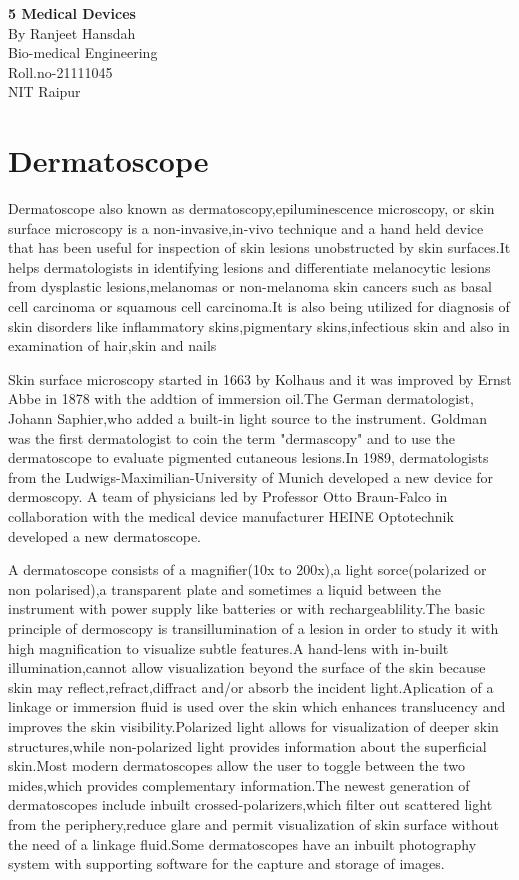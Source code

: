 \documentclass[12pt,A4paper]{article}
\begin{document}
\begin{center}
\huge\textbf{5 Medical Devices}\\[10pt]
\large{By Ranjeet Hansdah}\\
\large{Bio-medical Engineering}\\
\large{Roll.no-21111045}\\
\large{NIT Raipur}\\
\end{center}
\newpage
\section{Dermatoscope}

Dermatoscope also known as dermatoscopy,epiluminescence microscopy, or skin surface microscopy is a non-invasive,in-vivo technique and a hand held device that has been useful for inspection of skin lesions unobstructed by skin surfaces.It helps dermatologists in identifying lesions and differentiate melanocytic lesions from dysplastic lesions,melanomas or non-melanoma skin cancers such as basal cell carcinoma or squamous cell carcinoma.It is also being utilized for diagnosis of skin disorders like inflammatory skins,pigmentary skins,infectious skin and also in examination of hair,skin and nails

Skin surface microscopy started in 1663 by Kolhaus and it was improved by Ernst Abbe in 1878 with the addtion of immersion oil.The German dermatologist, Johann Saphier,who added a built-in light source to the instrument. Goldman was the first dermatologist to coin the term "dermascopy" and to use the dermatoscope to evaluate pigmented cutaneous lesions.In 1989, dermatologists from the Ludwigs-Maximilian-University of Munich developed a new device for dermoscopy. A team of physicians led by Professor Otto Braun-Falco in collaboration with the medical device manufacturer HEINE Optotechnik developed a new dermatoscope.

A dermatoscope consists of a magnifier(10x to 200x),a light sorce(polarized or non polarised),a transparent plate and sometimes a liquid between the instrument with power supply like batteries or with rechargeablility.The basic principle of dermoscopy is transillumination of a lesion in order to study it with high magnification to visualize subtle features.A hand-lens with in-built illumination,cannot allow visualization beyond the surface of the skin because skin may reflect,refract,diffract and/or absorb the incident light.Aplication of a linkage or immersion fluid is used over the skin which enhances translucency and improves the skin visibility.Polarized light allows for visualization of deeper skin structures,while non-polarized light provides information about the superficial skin.Most modern dermatoscopes allow the user to toggle between the two mides,which provides complementary information.The newest generation of dermatoscopes include inbuilt crossed-polarizers,which filter out scattered light from the periphery,reduce glare and permit visualization of skin surface without the need of a linkage fluid.Some dermatoscopes have an inbuilt photography system with supporting software for the capture and storage of images.
\end{document}
